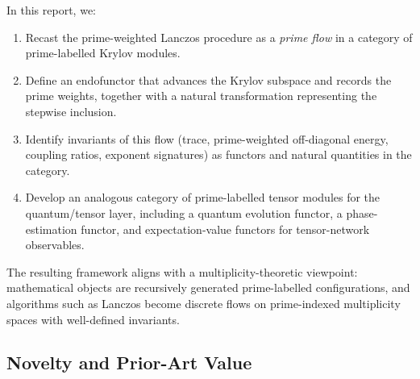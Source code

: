 \documentclass[11pt]{article}
\begin{document}
In this report, we:
\begin{enumerate}
  \item Recast the prime-weighted Lanczos procedure as a \emph{prime
  flow} in a category of prime-labelled Krylov modules.
  \item Define an endofunctor that advances the Krylov subspace and
  records the prime weights, together with a natural transformation
  representing the stepwise inclusion.
  \item Identify invariants of this flow (trace, prime-weighted
  off-diagonal energy, coupling ratios, exponent signatures) as functors
  and natural quantities in the category.
  \item Develop an analogous category of prime-labelled tensor modules
  for the quantum/tensor layer, including a quantum evolution functor,
  a phase-estimation functor, and expectation-value functors for
  tensor-network observables.
\end{enumerate}

The resulting framework aligns with a multiplicity-theoretic viewpoint:
mathematical objects are recursively generated prime-labelled
configurations, and algorithms such as Lanczos become discrete flows on
prime-indexed multiplicity spaces with well-defined invariants.

\subsection{Novelty and Prior-Art Value}
\end{document}

